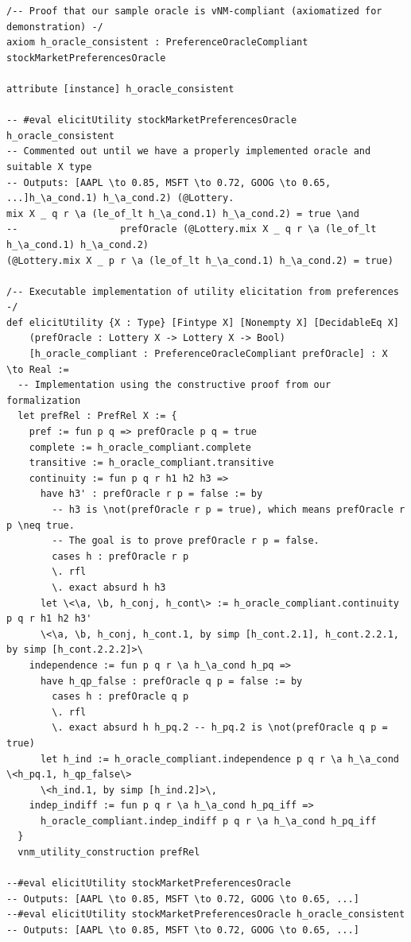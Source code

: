 \documentclass{article}
\theoremstyle{definition}
\begin{document}
\begin{lstlisting}[caption={Computational Evidence: Extracting and Running the Verified Code: Lean 4 Implementation}]
/-- Proof that our sample oracle is vNM-compliant (axiomatized for demonstration) -/
axiom h_oracle_consistent : PreferenceOracleCompliant stockMarketPreferencesOracle

attribute [instance] h_oracle_consistent

-- #eval elicitUtility stockMarketPreferencesOracle h_oracle_consistent
-- Commented out until we have a properly implemented oracle and suitable X type
-- Outputs: [AAPL \to 0.85, MSFT \to 0.72, GOOG \to 0.65, ...]h_\a_cond.1) h_\a_cond.2) (@Lottery.
mix X _ q r \a (le_of_lt h_\a_cond.1) h_\a_cond.2) = true \and
--                  prefOracle (@Lottery.mix X _ q r \a (le_of_lt h_\a_cond.1) h_\a_cond.2)
(@Lottery.mix X _ p r \a (le_of_lt h_\a_cond.1) h_\a_cond.2) = true)

/-- Executable implementation of utility elicitation from preferences -/
def elicitUtility {X : Type} [Fintype X] [Nonempty X] [DecidableEq X]
    (prefOracle : Lottery X -> Lottery X -> Bool)
    [h_oracle_compliant : PreferenceOracleCompliant prefOracle] : X \to Real :=
  -- Implementation using the constructive proof from our formalization
  let prefRel : PrefRel X := {
    pref := fun p q => prefOracle p q = true
    complete := h_oracle_compliant.complete
    transitive := h_oracle_compliant.transitive
    continuity := fun p q r h1 h2 h3 =>
      have h3' : prefOracle r p = false := by
        -- h3 is \not(prefOracle r p = true), which means prefOracle r p \neq true.
        -- The goal is to prove prefOracle r p = false.
        cases h : prefOracle r p
        \. rfl
        \. exact absurd h h3
      let \<\a, \b, h_conj, h_cont\> := h_oracle_compliant.continuity p q r h1 h2 h3'
      \<\a, \b, h_conj, h_cont.1, by simp [h_cont.2.1], h_cont.2.2.1, by simp [h_cont.2.2.2]>\
    independence := fun p q r \a h_\a_cond h_pq =>
      have h_qp_false : prefOracle q p = false := by
        cases h : prefOracle q p
        \. rfl
        \. exact absurd h h_pq.2 -- h_pq.2 is \not(prefOracle q p = true)
      let h_ind := h_oracle_compliant.independence p q r \a h_\a_cond \<h_pq.1, h_qp_false\>
      \<h_ind.1, by simp [h_ind.2]>\,
    indep_indiff := fun p q r \a h_\a_cond h_pq_iff =>
      h_oracle_compliant.indep_indiff p q r \a h_\a_cond h_pq_iff
  }
  vnm_utility_construction prefRel

--#eval elicitUtility stockMarketPreferencesOracle
-- Outputs: [AAPL \to 0.85, MSFT \to 0.72, GOOG \to 0.65, ...]
--#eval elicitUtility stockMarketPreferencesOracle h_oracle_consistent
-- Outputs: [AAPL \to 0.85, MSFT \to 0.72, GOOG \to 0.65, ...]
\end{lstlisting}
\end{document}
